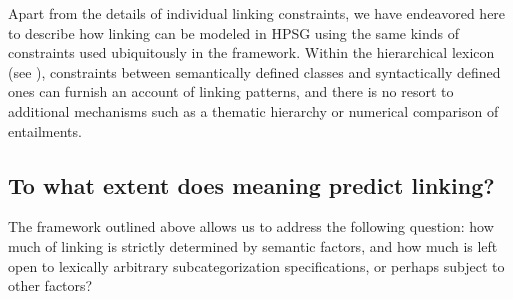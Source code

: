 \documentclass[output=paper
 	        ,biblatex
                ,babelshorthands
                ,newtxmath
                ,draftmode
                ,colorlinks, citecolor=brown
]{langscibook}
\begin{document}
\begin{exe}\ex\label{with-linking}
\end{exe} 


Apart from the details of individual linking constraints, we have endeavored here to describe how linking can be modeled in HPSG using the same kinds of constraints used ubiquitously in the framework.
Within the hierarchical lexicon (see ), constraints between semantically defined classes and syntactically defined ones can furnish an account of linking patterns, and there is no resort to additional mechanisms such as a thematic hierarchy or numerical comparison of entailments.



\subsection{To what extent does meaning predict linking?}

The framework outlined above allows us to address the following question: how much of linking is strictly determined by semantic factors, and how much is left open to 
lexically arbitrary subcategorization specifications, or perhaps subject to other factors?
\end{document}
